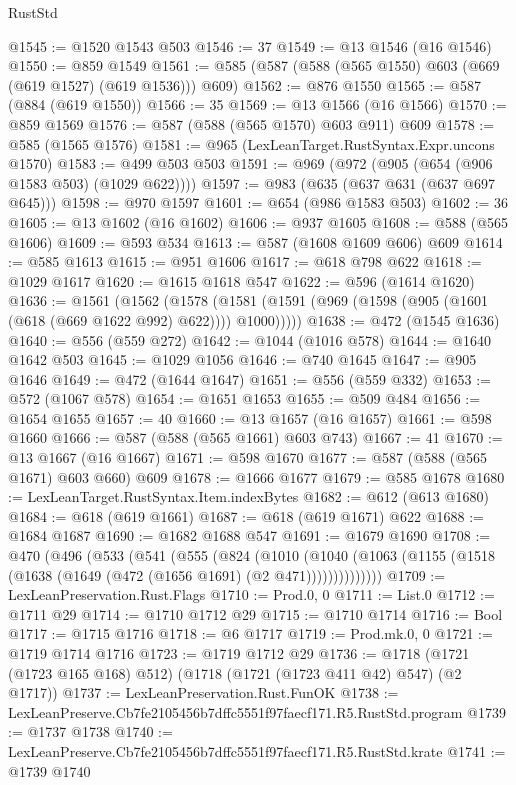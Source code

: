 \begin{lexlean}{RustStd}
\begin{coremodule}
@1545 := @1520 @1543 @503
@1546 := 37
@1549 := @13 @1546 (@16 @1546)
@1550 := @859 @1549
@1561 := @585 (@587 (@588 (@565 @1550) @603 (@669 (@619 @1527) (@619 @1536))) @609)
@1562 := @876 @1550
@1565 := @587 (@884 (@619 @1550))
@1566 := 35
@1569 := @13 @1566 (@16 @1566)
@1570 := @859 @1569
@1576 := @587 (@588 (@565 @1570) @603 @911) @609
@1578 := @585 (@1565 @1576)
@1581 := @965 (LexLeanTarget.RustSyntax.Expr.uncons @1570)
@1583 := @499 @503 @503
@1591 := @969 (@972 (@905 (@654 (@906 @1583 @503) (@1029 @622))))
@1597 := @983 (@635 (@637 @631 (@637 @697 @645)))
@1598 := @970 @1597
@1601 := @654 (@986 @1583 @503)
@1602 := 36
@1605 := @13 @1602 (@16 @1602)
@1606 := @937 @1605
@1608 := @588 (@565 @1606)
@1609 := @593 @534
@1613 := @587 (@1608 @1609 @606) @609
@1614 := @585 @1613
@1615 := @951 @1606
@1617 := @618 @798 @622
@1618 := @1029 @1617
@1620 := @1615 @1618 @547
@1622 := @596 (@1614 @1620)
@1636 := @1561
    (@1562
      (@1578 (@1581 (@1591 (@969 (@1598 (@905 (@1601 (@618 (@669 @1622 @992) @622)))) @1000)))))
@1638 := @472 (@1545 @1636)
@1640 := @556 (@559 @272)
@1642 := @1044 (@1016 @578)
@1644 := @1640 @1642 @503
@1645 := @1029 @1056
@1646 := @740 @1645
@1647 := @905 @1646
@1649 := @472 (@1644 @1647)
@1651 := @556 (@559 @332)
@1653 := @572 (@1067 @578)
@1654 := @1651 @1653
@1655 := @509 @484
@1656 := @1654 @1655
@1657 := 40
@1660 := @13 @1657 (@16 @1657)
@1661 := @598 @1660
@1666 := @587 (@588 (@565 @1661) @603 @743)
@1667 := 41
@1670 := @13 @1667 (@16 @1667)
@1671 := @598 @1670
@1677 := @587 (@588 (@565 @1671) @603 @660) @609
@1678 := @1666 @1677
@1679 := @585 @1678
@1680 := LexLeanTarget.RustSyntax.Item.indexBytes
@1682 := @612 (@613 @1680)
@1684 := @618 (@619 @1661)
@1687 := @618 (@619 @1671) @622
@1688 := @1684 @1687
@1690 := @1682 @1688 @547
@1691 := @1679 @1690
@1708 := @470
    (@496
      (@533
        (@541
          (@555
            (@824
              (@1010
                (@1040 (@1063 (@1155 (@1518 (@1638 (@1649 (@472 (@1656 @1691) (@2 @471))))))))))))))
@1709 := LexLeanPreservation.Rust.Flags
@1710 := Prod.{0, 0}
@1711 := List.{0}
@1712 := @1711 @29
@1714 := @1710 @1712 @29
@1715 := @1710 @1714
@1716 := Bool
@1717 := @1715 @1716
@1718 := @6 @1717
@1719 := Prod.mk.{0, 0}
@1721 := @1719 @1714 @1716
@1723 := @1719 @1712 @29
@1736 := @1718 (@1721 (@1723 @165 @168) @512) (@1718 (@1721 (@1723 @411 @42) @547) (@2 @1717))
@1737 := LexLeanPreservation.Rust.FunOK
@1738 := LexLeanPreserve.Cb7fe2105456b7dffc5551f97faecf171.R5.RustStd.program
@1739 := @1737 @1738
@1740 := LexLeanPreserve.Cb7fe2105456b7dffc5551f97faecf171.R5.RustStd.krate
@1741 := @1739 @1740

\end{coremodule}
\end{lexlean}
